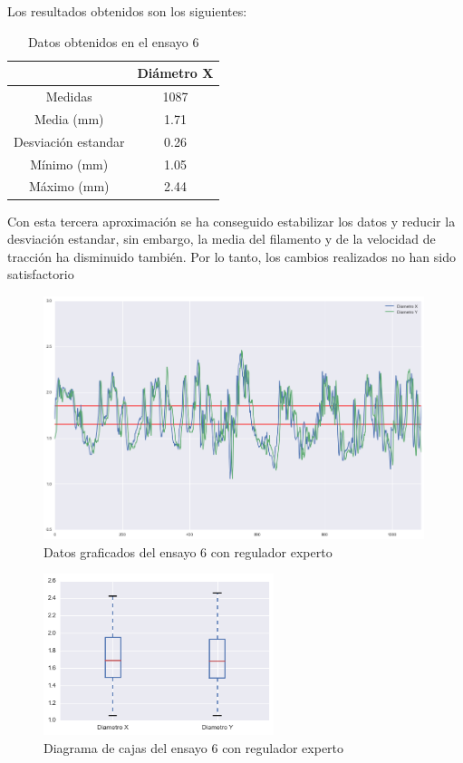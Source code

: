 Los resultados obtenidos son los siguientes:

\begin{table}[H]
	\centering
	\begin{tabular}{cc}
		                    & Diámetro X \\ \hline
		Medidas             & 1087      \\
		Media (mm)          & 1.71       \\
		Desviación estandar & 0.26       \\
		Mínimo (mm)         & 1.05       \\
		Máximo (mm)         & 2.44      
	\end{tabular}
	\caption{Datos obtenidos en el ensayo 6}
	\label{tab:resl_ens6}
\end{table}

Con esta tercera aproximación se ha conseguido estabilizar los datos y reducir la desviación estandar, sin embargo, la media del filamento y de la velocidad de tracción ha disminuido también. Por lo tanto, los cambios realizados no han sido satisfactorio

\begin{figure}[H]
    \centering
    \includegraphics[width=0.99\textwidth]{images/producciones/13082015/output_9_e3.png}
    \caption{Datos graficados del ensayo 6 con regulador experto}
    \label{fig:reg_graf6}
\end{figure}

\begin{figure}[H]
    \centering
    \includegraphics[width=0.6\textwidth]{images/producciones/13082015/output_10_e3.png}
    \caption{Diagrama de cajas del ensayo 6 con regulador experto}
    \label{fig:reg_cajas6}
\end{figure}

